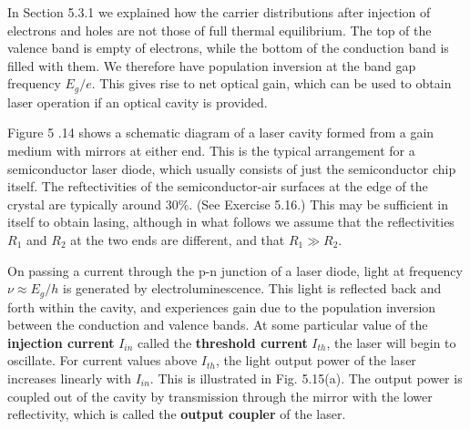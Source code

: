 \documentclass[12pt]{book}
\begin{document}
{In Section 5.3.1 we explained how the carrier distributions after injection of electrons and holes are not those of full thermal equilibrium. The top of the valence band is empty of electrons, while the bottom of the conduction band is filled with them. We therefore have population inversion at the band gap frequency $E_g/e$. This gives rise to net optical gain, which can be used to obtain laser operation if an optical cavity is provided.

Figure 5 .14 shows a schematic diagram of a laser cavity formed from a gain medium with mirrors at either end. This is the typical arrangement for a semiconductor laser diode, which usually consists of just the semiconductor chip itself. The reftectivities of the semiconductor-air surfaces at the edge of the crystal are typically around $30 \%$. (See Exercise 5.16.) This may be sufficient in itself to obtain lasing, although in what follows we assume that the reflectivities $R_1$ and $R_2$ at the two ends are different, and that $R_1\gg R_2$.

On passing a current through the p-n junction of a laser diode, light at frequency $\nu\approx E_g/h$ is generated by electroluminescence. This light is reflected back and forth within the cavity, and experiences gain due to the population inversion between the conduction and valence bands. At some particular value of the \textbf{injection current} $I_{in}$ called the \textbf{threshold current} $I_{th}$, the laser will begin to oscillate. For current values above $I_{th}$, the light output power of the laser increases linearly with $I_{in}$. This is illustrated in Fig. 5.15(a). The output power is coupled out of the cavity by transmission through the mirror with the lower reflectivity, which is called the \textbf{output coupler} of the laser.

}
\end{document}
